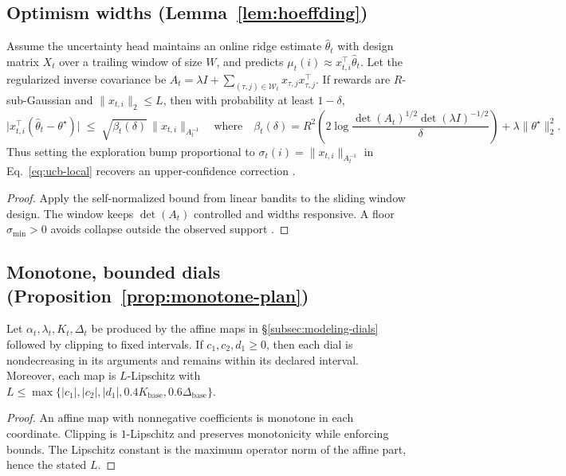 \subsection{Optimism widths (Lemma~\ref{lem:hoeffding})}
\begin{lemma}
\label{lem:hoeffding}
Assume the uncertainty head maintains an online ridge estimate $\hat{\theta}_t$ with design matrix $X_t$ over a trailing window of size $W$, and predicts $\mu_t(i)\approx x_{t,i}^\top \hat{\theta}_t$. Let the regularized inverse covariance be $A_t=\lambda I + \sum_{(\tau,j)\in\mathcal{W}_t} x_{\tau,j}x_{\tau,j}^\top$. If rewards are $R$-sub-Gaussian and $\|x_{t,i}\|_2\le L$, then with probability at least $1-\delta$,
\[
\big|x_{t,i}^\top(\hat{\theta}_t-\theta^\star)\big| \;\le\; \sqrt{\beta_t(\delta)}\,\|x_{t,i}\|_{A_t^{-1}}
\quad\text{where}\quad
\beta_t(\delta)=R^2\!\left(2\log\frac{\det(A_t)^{1/2}\det(\lambda I)^{-1/2}}{\delta}\right)+\lambda \|\theta^\star\|_2^2.
\]
Thus setting the exploration bump proportional to $\sigma_t(i)=\|x_{t,i}\|_{A_t^{-1}}$ in Eq.~\eqref{eq:ucb-local} recovers an upper-confidence correction \cite{Li2010,Chu2011}.
\end{lemma}

\begin{proof}
Apply the self-normalized bound from linear bandits to the sliding window design. The window keeps $\det(A_t)$ controlled and widths responsive. A floor $\sigma_{\min}>0$ avoids collapse outside the observed support \cite{Li2010,Chu2011}.
\end{proof}

\subsection{Monotone, bounded dials (Proposition~\ref{prop:monotone-plan})}
\begin{proposition}
\label{prop:monotone-plan}
Let $\alpha_t,\lambda_t,K_t,\Delta_t$ be produced by the affine maps in §\ref{subsec:modeling-dials} followed by clipping to fixed intervals. If $c_1,c_2,d_1\ge 0$, then each dial is nondecreasing in its arguments and remains within its declared interval. Moreover, each map is $L$-Lipschitz with
$L\le\max\{|c_1|,|c_2|,|d_1|,0.4K_{\mathrm{base}},0.6\Delta_{\mathrm{base}}\}$.
\end{proposition}

\begin{proof}
An affine map with nonnegative coefficients is monotone in each coordinate. Clipping is $1$-Lipschitz and preserves monotonicity while enforcing bounds. The Lipschitz constant is the maximum operator norm of the affine part, hence the stated $L$.
\end{proof}

